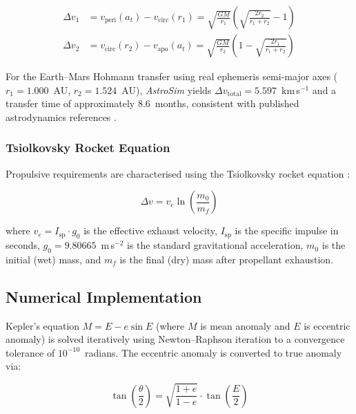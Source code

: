 \documentclass[10pt,a4paper]{article}
\begin{document}
\begin{align}
\Delta v_1 &= v_{\mathrm{peri}}(a_t) - v_{\mathrm{circ}}(r_1)
            = \sqrt{\frac{GM}{r_1}}\left(\sqrt{\frac{2r_2}{r_1+r_2}} - 1\right)
\label{eq:dv1} \\[4pt]
\Delta v_2 &= v_{\mathrm{circ}}(r_2) - v_{\mathrm{apo}}(a_t)
            = \sqrt{\frac{GM}{r_2}}\left(1 - \sqrt{\frac{2r_1}{r_1+r_2}}\right)
\label{eq:dv2}
\end{align}

For the Earth--Mars Hohmann transfer using real ephemeris semi-major axes
($r_1 = 1.000$~AU, $r_2 = 1.524$~AU), \textit{AstroSim} yields
$\Delta v_{\mathrm{total}} = 5.597$~km\,s$^{-1}$ and a transfer time of
approximately 8.6~months, consistent with published astrodynamics
references \citep{vallado2013}.

\subsubsection{Tsiolkovsky Rocket Equation}

Propulsive requirements are characterised using the Tsiolkovsky rocket equation
\citep{tsiolkovsky1903}:

\begin{formulabox}
\begin{equation}
\Delta v = v_e \ln\!\left(\frac{m_0}{m_f}\right)
\label{eq:tsiolkovsky}
\end{equation}
\end{formulabox}

where $v_e = I_{\mathrm{sp}} \cdot g_0$ is the effective exhaust velocity,
$I_{\mathrm{sp}}$ is the specific impulse in seconds, $g_0 = 9.80665$~m\,s$^{-2}$
is the standard gravitational acceleration, $m_0$ is the initial (wet) mass,
and $m_f$ is the final (dry) mass after propellant exhaustion.

\subsection{Numerical Implementation}

Kepler's equation $M = E - e\sin E$ (where $M$ is mean anomaly and $E$ is
eccentric anomaly) is solved iteratively using Newton--Raphson iteration to
a convergence tolerance of $10^{-10}$~radians.
The eccentric anomaly is converted to true anomaly via:

\begin{equation}
\tan\!\left(\frac{\theta}{2}\right) =
  \sqrt{\frac{1+e}{1-e}} \cdot \tan\!\left(\frac{E}{2}\right)
\label{eq:ea_to_ta}
\end{equation}
\end{document}
